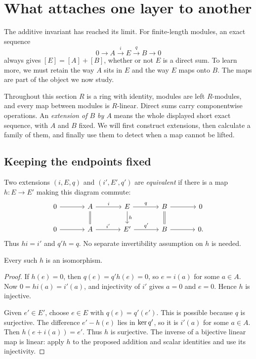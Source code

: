 \section{What attaches one layer to another}\label{x:extensions}

The additive invariant has reached its limit. For finite-length modules,
an exact sequence
\[
0\longrightarrow A\xrightarrow{i}E\xrightarrow{q}B\longrightarrow0
\]
always gives $[E]=[A]+[B]$, whether or not $E$ is a direct sum. To learn
more, we must retain the way $A$ sits in $E$ and the way $E$ maps onto $B$.
The maps are part of the object we now study.

Throughout this section $R$ is a ring with identity, modules are left
$R$-modules, and every map between modules is $R$-linear. Direct sums carry
componentwise operations. An \emph{extension of $B$ by $A$} means the whole
displayed short exact sequence, with $A$ and $B$ fixed. We will first
construct extensions, then calculate a family of them, and finally use
them to detect when a map cannot be lifted.

\subsection{Keeping the endpoints fixed}

Two extensions $(i,E,q)$ and $(i',E',q')$ are \emph{equivalent} if there is
a map $h:E\to E'$ making this diagram commute:
\[
\begin{tikzcd}[column sep=large]
0\arrow[r]&A\arrow[r,"i"]\arrow[d,equal]
 &E\arrow[r,"q"]\arrow[d,"h"]&B\arrow[r]\arrow[d,equal]&0\\
0\arrow[r]&A\arrow[r,"i'"]&E'\arrow[r,"q'"]&B\arrow[r]&0.
\end{tikzcd}
\]
Thus $hi=i'$ and $q'h=q$. No separate invertibility assumption on $h$ is
needed.

\begin{lemma}\label{x:marked-iso}
Every such $h$ is an isomorphism.
\end{lemma}
\begin{proof}
If $h(e)=0$, then $q(e)=q'h(e)=0$, so $e=i(a)$ for some $a\in A$.
Now $0=hi(a)=i'(a)$, and injectivity of $i'$ gives $a=0$ and $e=0$.
Hence $h$ is injective.

Given $e'\in E'$, choose $e\in E$ with $q(e)=q'(e')$. This is possible
because $q$ is surjective. The difference $e'-h(e)$ lies in $\operatorname{ker} q'$, so
it is $i'(a)$ for some $a\in A$. Then $h(e+i(a))=e'$. Thus $h$ is
surjective. The inverse of a bijective linear map is linear: apply $h$ to
the proposed addition and scalar identities and use its injectivity.
\end{proof}

